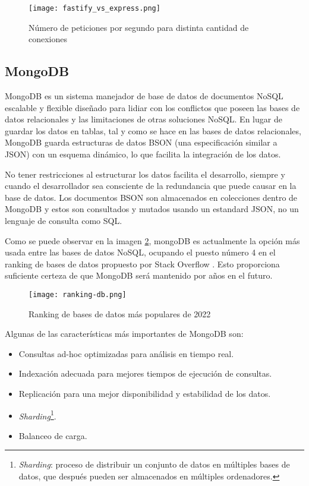 \begin{figure}[H]
    \centering
    \texttt{[image: fastify\_vs\_express.png]}
    \caption{ Número de peticiones por segundo para distinta cantidad de conexiones\cite{FastifyVsExpress}}
    \label{fig:fastify_vs_express}
\end{figure}

\subsection{MongoDB}

MongoDB es un sistema manejador de base de datos de documentos NoSQL escalable y flexible diseñado para lidiar con los conflictos que poseen las bases de datos relacionales y las limitaciones de otras soluciones NoSQL. En lugar de guardar los datos en tablas, tal y como se hace en las bases de datos relacionales, MongoDB guarda estructuras de datos BSON (una especificación similar a JSON) con un esquema dinámico, lo que facilita la integración de los datos.

No tener restricciones al estructurar los datos facilita el desarrollo, siempre y cuando el desarrollador sea consciente de la redundancia que puede causar en la base de datos. Los documentos BSON son almacenados en colecciones dentro de MongoDB y estos son consultados y mutados usando un estandard JSON, no un lenguaje de consulta como SQL.

Como se puede observar en la imagen \ref{fig:ranking-db}, mongoDB es actualmente la opción más usada entre las bases de datos NoSQL, ocupando el puesto número 4 en el ranking de bases de datos propuesto por Stack Overflow \cite{StackOverflowSurvey}. Esto proporciona suficiente certeza de que MongoDB será mantenido por años en el futuro.

\begin{figure}[H]
    \centering
    \texttt{[image: ranking-db.png]}
    \caption{Ranking de bases de datos más populares de 2022}
    \label{fig:ranking-db}
\end{figure}

Algunas de las características más importantes de MongoDB son:

\begin{itemize}
  \item Consultas ad-hoc optimizadas para análisis en tiempo real.
  \item Indexación adecuada para mejores tiempos de ejecución de consultas.
  \item Replicación para una mejor disponibilidad y estabilidad de los datos.
  \item \textit{Sharding}\footnote{\textit{Sharding}: proceso de distribuir un conjunto de datos en múltiples bases de datos, que después pueden ser almacenados en múltiples ordenadores.}.
  \item Balanceo de carga.
\end{itemize}

